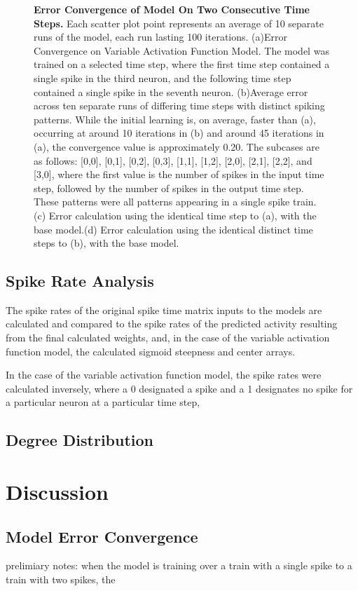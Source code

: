 \documentclass[11pt]{article}
\begin{document}
\begin{figure}[H]
\caption{\textbf{Error Convergence of Model On Two Consecutive Time Steps.} Each scatter plot point represents an average of 10 separate runs of the model, each run lasting 100 iterations. (a)Error Convergence on Variable Activation Function Model. The model was trained on a selected time step, where the first time step contained a single spike in the third neuron, and the following time step contained a single spike in the seventh neuron. (b)Average error across ten separate runs of differing time steps with distinct spiking patterns. While the initial learning is, on average, faster than (a), occurring at around 10 iterations in (b) and around 45 iterations in (a), the convergence value is approximately 0.20. The subcases are as follows: [0,0], [0,1], [0,2], [0,3], [1,1], [1,2], [2,0], [2,1], [2,2], and [3,0], where the first value is the number of spikes in the input time step, followed by the number of spikes in the output time step. These patterns were all patterns appearing in a single spike train. (c) Error calculation using the identical time step to (a), with the base model.(d) Error calculation using the identical distinct time steps to (b), with the base model.}
\label{fig:errorTwoTime}
\end{figure}

\subsection{Spike Rate Analysis}
The spike rates of the original spike time matrix inputs to the models are calculated and compared to the spike rates of the predicted activity resulting from the final calculated weights, and, in the case of the variable activation function model, the calculated sigmoid steepness and center arrays.\par
In the case of the variable activation function model, the spike rates were calculated inversely, where a 0 designated a spike and a 1 designates no spike for a particular neuron at a particular time step,

\subsection{Degree Distribution}

\section{Discussion}

\subsection{Model Error Convergence}
prelimiary notes: when the model is training over a train with a single spike to a train with two spikes, the 
\end{document}
